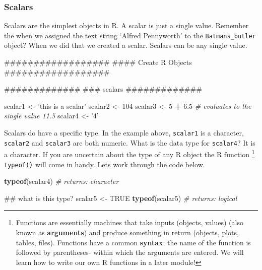 \documentclass[]{article}
\newenvironment{Shaded}{\begin{snugshade}}{\end{snugshade}}
\newcommand{\KeywordTok}[1]{\textcolor[rgb]{0.13,0.29,0.53}{\textbf{#1}}}
\newcommand{\DecValTok}[1]{\textcolor[rgb]{0.00,0.00,0.81}{#1}}
\newcommand{\FloatTok}[1]{\textcolor[rgb]{0.00,0.00,0.81}{#1}}
\newcommand{\StringTok}[1]{\textcolor[rgb]{0.31,0.60,0.02}{#1}}
\newcommand{\CommentTok}[1]{\textcolor[rgb]{0.56,0.35,0.01}{\textit{#1}}}
\newcommand{\OtherTok}[1]{\textcolor[rgb]{0.56,0.35,0.01}{#1}}
\newcommand{\OperatorTok}[1]{\textcolor[rgb]{0.81,0.36,0.00}{\textbf{#1}}}
\newcommand{\NormalTok}[1]{#1}
\let\rmarkdownfootnote\footnote%
\def\footnote{\protect\rmarkdownfootnote}
\begin{document}
\subsubsection{Scalars}\label{scalars}

Scalars are the simplest objects in R. A scalar is just a single value.
Remember the when we assigned the text string `Alfred Pennyworth' to the
\texttt{Batmans\_butler} object? When we did that we created a scalar.
Scalars can be any single value.

\begin{Shaded}
\begin{Highlighting}[]
\NormalTok{##################}
\NormalTok{####  Create R Objects }
\NormalTok{##################}

\NormalTok{#############}
\NormalTok{### scalars}
\NormalTok{#############}

\NormalTok{scalar1 <-}\StringTok{ 'this is a scalar'}
\NormalTok{scalar2 <-}\StringTok{ }\DecValTok{104}
\NormalTok{scalar3 <-}\StringTok{ }\DecValTok{5} \OperatorTok{+}\StringTok{ }\FloatTok{6.5}    \CommentTok{# evaluates to the single value 11.5}
\NormalTok{scalar4 <-}\StringTok{ '4'}
\end{Highlighting}
\end{Shaded}

Scalars do have a specific type. In the example above, \texttt{scalar1}
is a character, \texttt{scalar2} and \texttt{scalar3} are both numeric.
What is the data type for \texttt{scalar4}? It is a character. If you
are uncertain about the type of any R object the R function \footnote{Functions
  are essentially machines that take inputs (objects, values) (also
  known as \textbf{arguments}) and produce something in return (objects,
  plots, tables, files). Functions have a common \textbf{syntax}: the
  name of the function is followed by parentheses- within which the
  arguments are entered. We will learn how to write our own R functions
  in a later module!} \texttt{typeof()} will come in handy. Lets work
through the code below.

\begin{Shaded}
\begin{Highlighting}[]
\KeywordTok{typeof}\NormalTok{(scalar4)    }\CommentTok{# returns: character}

\NormalTok{## what is this type?}
\NormalTok{scalar5 <-}\StringTok{ }\OtherTok{TRUE}
\KeywordTok{typeof}\NormalTok{(scalar5)    }\CommentTok{# returns: logical}
\end{Highlighting}
\end{Shaded}
\end{document}
